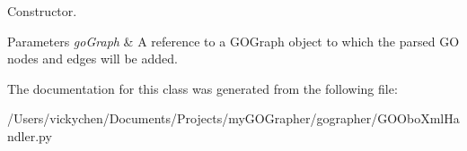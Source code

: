 Constructor. 


\begin{DoxyParams}{Parameters}
{\em goGraph} & A reference to a GOGraph object to which the parsed GO nodes and edges will be added. \\
\hline
\end{DoxyParams}


The documentation for this class was generated from the following file:\begin{DoxyCompactItemize}
\item 
/Users/vickychen/Documents/Projects/myGOGrapher/gographer/GOOboXmlHandler.py\end{DoxyCompactItemize}
